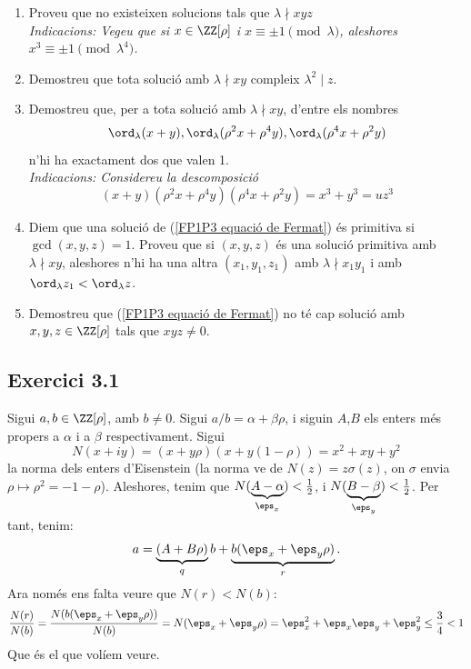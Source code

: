 \documentclass[11pt, a4paper]{article}
\begin{document}
\begin{tcolorbox}[title=\section{FP 1 Exercici 3}]
\begin{enumerate}
            \item Proveu que no existeixen solucions tals que $\lambda\nmid xyz$\\
            \textit{Indicacions: Vegeu que si $x\in\ZZ[\rho]$ i $x\equiv \pm1\pmod\lambda$, aleshores $x^3\equiv \pm 1\pmod {\lambda^4}$.}
            \item Demostreu que tota solució amb $\lambda\nmid xy$ compleix $\lambda^2\mid z$.
            \item Demostreu que, per a tota solució amb $\lambda\nmid xy$, d'entre els nombres
            \[
                \ord_\lambda(x+y),
                \ord_\lambda(\rho^2x+\rho^4y),
                \ord_\lambda(\rho^4x+\rho^2y)
            \]
            n'hi ha exactament dos que valen 1.\\
            \textit{Indicacions: Considereu la descomposició
            \[
                (x+y)(\rho^2x+\rho^4y)(\rho^4x+\rho^2y)=x^3+y^3=uz^3
            \]}
            \item Diem que una solució de (\ref{FP1P3 equació de Fermat}) és primitiva si $\gcd(x,y,z)=1$. Proveu que si $(x,y,z)$ és una solució primitiva amb $\lambda\nmid xy$, aleshores n'hi ha una altra $(x_1,y_1,z_1)$ amb $\lambda\nmid x_1y_1$ i amb $\ord_\lambda z_1<\ord_\lambda z$.
            \item Demostreu que (\ref{FP1P3 equació de Fermat}) no té cap solució amb $x,y,z\in\ZZ[\rho]$ tals que $xyz\neq0$.
        \end{enumerate}
    \end{tcolorbox}
    \subsection{Exercici 3.1}
    Sigui $a,b\in \ZZ[\rho]$, amb $b\neq0$. Sigui $a/b=\alpha+\beta\rho$, i siguin $A$,$B$ els enters més propers a $\alpha$ i a $\beta$ respectivament. Sigui 
    \[
        N(x+iy)=(x+y\rho)(x+y(1-\rho))=x^2+xy+y^2
    \]
    la norma dels enters d'Eisenstein (la norma ve de $N(z)=z\sigma(z)$, on $\sigma$ envia $\rho\mapsto\rho^2=-1-\rho$). Aleshores, tenim que $N(\underbrace{A-\alpha}_{\eps_x})<\frac{1}{2}$, i $N(\underbrace{B-\beta}_{\eps_y})<\frac{1}{2}$. Per tant, tenim:
    \[
        a=\underbrace{(A+B\rho)}_qb+\underbrace{b(\eps_x+\eps_y\rho)}_r.
    \]
    Ara només ens falta veure que $N(r)<N(b)$:
    \[
        \frac{N(r)}{N(b)}=\frac{N(b(\eps_x+\eps_y\rho))}{N(b)}=N(\eps_x+\eps_y\rho)=
        \eps_x^2+\eps_x\eps_y+\eps_y^2\leq \frac{3}{4}<1
    \]
    Que és el que volíem veure.
\end{document}
